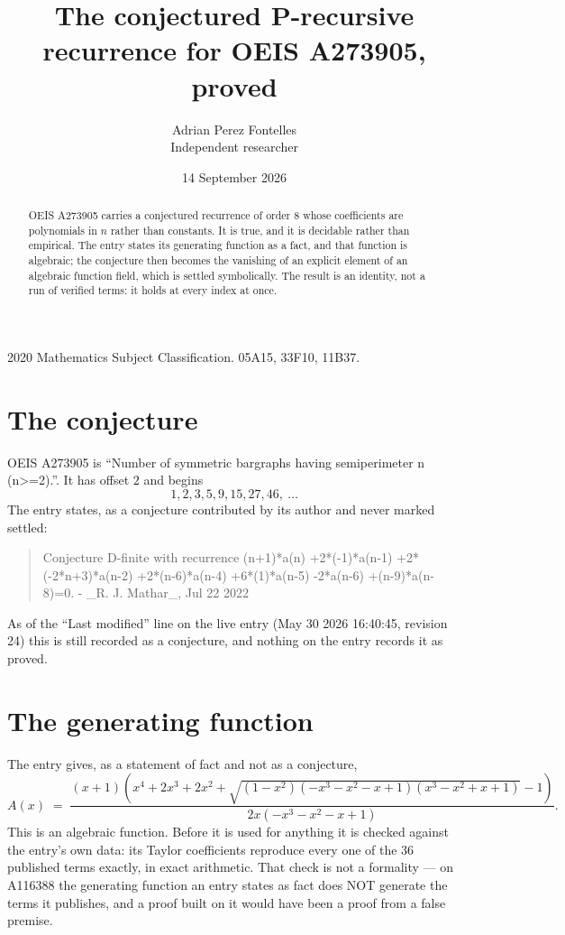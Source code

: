 \documentclass[11pt,a4paper]{article}
\title{The conjectured P-recursive recurrence for OEIS A273905, proved}
\author{Adrian Perez Fontelles\\ \small Independent researcher}
\date{14 September 2026}
\theoremstyle{plain}
\theoremstyle{definition}
\begin{document}
\maketitle

\begin{abstract}
OEIS A273905 carries a conjectured recurrence of order $8$ whose coefficients are polynomials in
$n$ rather than constants. It is true, and it is decidable rather than empirical. The entry
states its generating function as a fact, and that function is algebraic; the conjecture then
becomes the vanishing of an explicit element of an algebraic function field, which is settled
symbolically. The result is an identity, not a run of verified terms: it holds at every index
at once.
\end{abstract}

\noindent\small 2020 Mathematics Subject Classification. 05A15, 33F10, 11B37.\normalsize

\section{The conjecture}

OEIS A273905 is ``Number of symmetric bargraphs having semiperimeter n (n>=2).''. It has offset $2$ and begins
\[
1, 2, 3, 5, 9, 15, 27, 46,\ \dots
\]
The entry states, as a conjecture contributed by its author and never marked settled:
\begin{quote}\raggedright\small
Conjecture D-finite with recurrence (n+1)*a(n) +2*(-1)*a(n-1) +2*(-2*n+3)*a(n-2) +2*(n-6)*a(n-4) +6*(1)*a(n-5) -2*a(n-6) +(n-9)*a(n-8)=0. - \_R. J. Mathar\_, Jul 22 2022
\end{quote}
As of the ``Last modified'' line on the live entry (May 30 2026 16:40:45, revision 24)
this is still recorded as a conjecture, and nothing on the entry records it as proved.

\section{The generating function}

The entry gives, as a statement of fact and not as a conjecture,
\[
A(x)\;=\;\frac{\left(x + 1\right) \left(x^{4} + 2 x^{3} + 2 x^{2} + \sqrt{\left(1 - x^{2}\right) \left(- x^{3} - x^{2} - x + 1\right) \left(x^{3} - x^{2} + x + 1\right)} - 1\right)}{2 x \left(- x^{3} - x^{2} - x + 1\right)} .
\]
This is an algebraic function. Before it is used for anything it is checked against the entry's
own data: its Taylor coefficients reproduce every one of the $36$ published terms
exactly, in exact arithmetic. That check is not a formality --- on A116388 the generating
function an entry states as fact does NOT generate the terms it publishes, and a proof built on
it would have been a proof from a false premise.
\end{document}
